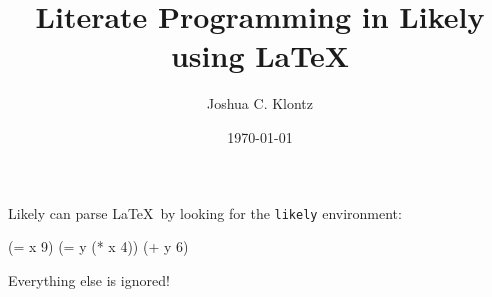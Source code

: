 \documentclass{article}
\title{Literate Programming in Likely using \LaTeX}
\author{Joshua C. Klontz}
\date{\today}
\newenvironment{likely}
{ \verbatim }
{ \endverbatim }
\begin{document}
\maketitle

Likely can parse \LaTeX\ by looking for the \texttt{likely} environment:

\begin{likely}
(= x 9)
(= y (* x 4))
(+ y 6)
\end{likely}

Everything else is ignored!
\end{document}
